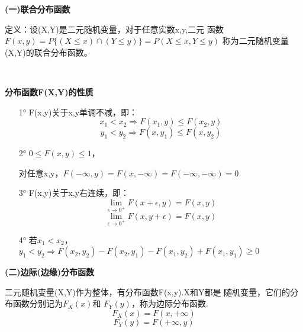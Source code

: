 \textbf{(一)联合分布函数}


定义：设(X,Y)是二元随机变量，对于任意实数x,y,二元
函数$F(x,y)=P\{(X\leq x)\cap (Y\leq y)\}=P(X\leq x,Y\leq y)$
称为二元随机变量(X,Y)的联合分布函数。


~\\
\begin{center}
    \textbf{分布函数F(X,Y)的性质}
\end{center}
\begin{itemize}
    \item [1°]F(x,y)关于x,y单调不减，即：
    $$x_1 < x_2\Rightarrow F(x_1,y) \leq F(x_2,y)$$
    $$y_1 < y_2\Rightarrow F(x,y_1) \leq F(x,y_2)$$
    \item [2°]$0\leq F(x,y)\leq 1$，
    

    对任意x,y，$F(-\infty,y)=F(x,-\infty)=F(-\infty,-\infty)=0$
    \item [3°]F(x,y)关于x,y右连续，即：
    $$\lim\limits_{\epsilon \to 0^+}F(x+\epsilon,y)=F(x,y)$$
    $$\lim\limits_{\epsilon \to 0^+}F(x,y+\epsilon)=F(x,y)$$
    \item [4°]若$x_1<x_2$，$y_1<y_2 \Rightarrow 
    F(x_2,y_2)-F(x_2,y_1)-F(x_1,y_2)+F(x_1,y_1)\geq 0$
\end{itemize}

\textbf{(二)边际(边缘)分布函数}


二元随机变量(X,Y)作为整体，有分布函数F(x,y).X和Y都是
随机变量，它们的分布函数分别记为$F_X(x)$和
$F_Y(y)$，称为边际分布函数.
$$F_X(x)=F(x,+\infty)$$
$$F_Y(y)=F(+\infty,y)$$


\newpage